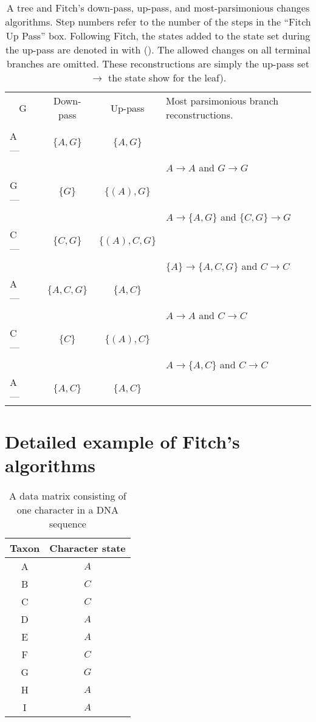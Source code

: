\documentclass[11pt]{article}
\begin{document}
\begin{table}[htdp]
\caption{A tree and Fitch's down-pass, up-pass, and most-parsimonious changes algorithms.  
Step numbers refer to the number of the steps in the ``Fitch Up Pass'' box.  
Following Fitch, the states added to the state set during the up-pass are denoted in with (). 
The allowed changes on all terminal branches are omitted. 
These reconstructions are simply the up-pass set $\rightarrow$ the state show for the leaf).}
\begin{center}
\begin{tabular}{p{8mm}|p{7mm}c|c|l}
\multicolumn{2}{c}{G} & Down-pass & Up-pass & Most parsimonious branch reconstructions.\\
& & & \\
A --- & &$\{A,G\}$ & $\{A,G\}$ & \\
						 & & & & $A \rightarrow A$ and $G \rightarrow G$\\
G --- & &$\{G\}$ & $\{(A),G\}$ & \\
					 & & & & $A \rightarrow \{A,G\}$ and  $\{C,G\}\rightarrow G$\\
C --- & &$\{C,G\}$ & $\{(A),C,G\}$ & \\
					 & & & & $\{A\} \rightarrow \{A,C,G\}$ and $C \rightarrow C$\\
A --- & &$\{A,C,G\}$ & $\{A,C\}$ & \\
					 & & & & $A \rightarrow A$ and $C \rightarrow C$ \\
C --- & &$\{C\}$ & $\{(A),C\}$ & \\
					 & & & & $A \rightarrow \{A,C\}$ and $C \rightarrow C$ \\
A --- & & $\{A,C\}$ & $\{A,C\}$ \\
\end{tabular}
\end{center}
\label{default}
\end{table}%



\newpage
\section*{Detailed example of Fitch's algorithms}

\begin{table}[htdp]
\caption{A data matrix consisting of one character in a DNA sequence}
\begin{center}
\label{dnaChar}
\begin{tabular}{|c|c|}
\hline 
Taxon & Character state \\ 
\hline 
A & $A$ \\
B & $C$ \\
C & $C$ \\
D & $A$ \\
E & $A$ \\
F & $C$ \\
G & $G$ \\
H & $A$ \\
I & $A$ \\
\hline
\end{tabular}
\end{center}
\end{table}
\end{document}
